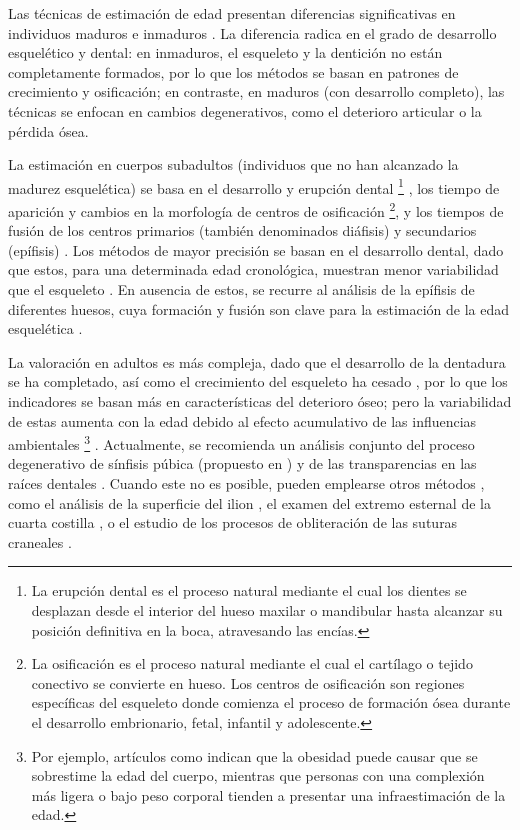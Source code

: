 Las técnicas de estimación de edad presentan diferencias significativas en individuos maduros e inmaduros \cite{ubelaker2019}. La diferencia radica en el grado de desarrollo esquelético y dental: en inmaduros, el esqueleto y la dentición no están completamente formados, por lo que los métodos se basan en patrones de crecimiento y osificación; en contraste, en maduros (con desarrollo completo), las técnicas se enfocan en cambios degenerativos, como el deterioro articular o la pérdida ósea.

La estimación en cuerpos subadultos (individuos que no han alcanzado la madurez esquelética) se basa en el desarrollo y erupción dental%
\footnote{
    La erupción dental es el proceso natural mediante el cual los dientes se desplazan desde el interior del hueso maxilar o mandibular hasta alcanzar su posición definitiva en la boca, atravesando las encías.
} 
\cite{cameriere2006}, los tiempo de aparición y cambios en la morfología de centros de osificación%
\footnote{
    La osificación es el proceso natural mediante el cual el cartílago o tejido conectivo se convierte en hueso. Los centros de osificación son regiones específicas del esqueleto donde comienza el proceso de formación ósea durante el desarrollo embrionario, fetal, infantil y adolescente.
},
y los tiempos de fusión de los centros primarios (también denominados diáfisis) y secundarios (epífisis) \cite{scheuer2000, adserias2019}. Los métodos de mayor precisión se basan en el desarrollo dental, dado que estos, para una determinada edad cronológica, muestran menor variabilidad que el esqueleto \cite{bowman1992}. En ausencia de estos, se recurre al análisis de la epífisis de diferentes huesos, cuya formación y fusión son clave para la estimación de la edad esquelética \cite{adserias2019}.

La valoración en adultos es más compleja, dado que el desarrollo de la dentadura se ha completado, así como el crecimiento del esqueleto ha cesado \cite{byers2023}, por lo que los indicadores se basan más en características del deterioro óseo; pero la variabilidad de estas aumenta con la edad debido al efecto acumulativo de las influencias ambientales%
\footnote{
    Por ejemplo, artículos como \cite{merritt2015,wescott2015} indican que la obesidad puede causar que se sobrestime la edad del cuerpo, mientras que personas con una complexión más ligera o bajo peso corporal tienden a presentar una infraestimación de la edad.
}
\cite{ubelaker2018, scheuer2004}. Actualmente, se recomienda un análisis conjunto del proceso degenerativo de sínfisis púbica (propuesto en \cite{brooks1990}) y de las transparencias en las raíces dentales \cite{baccino2014}. Cuando este no es posible, pueden emplearse otros métodos \cite{garvin2012}, como el análisis de la superficie del ilion \cite{lovejoy1985}, el examen del extremo esternal de la cuarta costilla \cite{iscan1984}, o el estudio de los procesos de obliteración de las suturas craneales \cite{meindl1985}.

